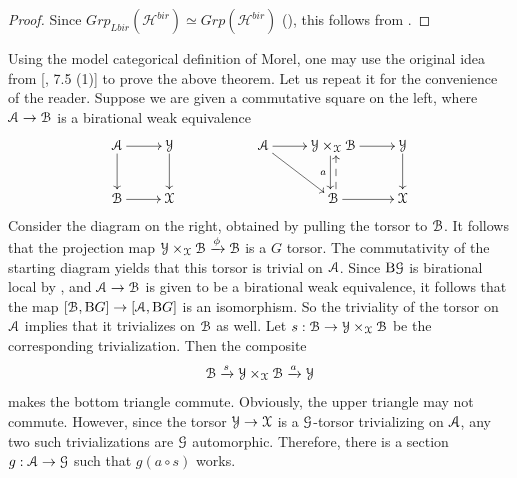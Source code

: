 \begin{proof}
Since $ Grp_{L{bir}}(\mathcal{H}^{bir})\simeq  Grp(\mathcal{H}^{bir})$ (), this follows from .
\end{proof}
\begin{rem}
Using the model categorical definition of Morel, one may use the original idea from [\cite{morel2012a1}, 7.5 (1)] to prove the above theorem. Let us repeat it for the convenience of the reader. Suppose we are given a commutative square on the left, where $\EuScript{A}\to \EuScript{B}$ is a birational weak equivalence \[\xymatrix{
 \esc{A}\ar[r]\ar[d]& \esc{Y}\ar[d]&& \esc{A}\ar[rd]\ar[r]&\esc{Y}\times_\esc{X}\esc{B}\ar[r]\ar@<-.2em>[d]_{a}& \esc{Y}\ar[d]\\
\esc{B}\ar[r]& \esc{X}&& &\esc{B}\ar@<-.2em>@{-->}[u]\ar[r]& \esc{X}
 }\]
 Consider the diagram on the right, obtained by pulling the torsor to $\EuScript{B}$. It follows that the projection map $\EuScript{Y}\times_\EuScript{X}\EuScript{B}\xrightarrow{\phi}\EuScript{B}$ is a $G$ torsor. The commutativity of the starting diagram yields that this torsor is trivial on $\EuScript{A}$. Since $\mathrm{B}\EuScript{G}$ is birational local by , and $\EuScript{A}\to \EuScript{B}$ is given to be a birational weak equivalence, it follows that the map $[\EuScript{B}, \mathrm{B}G]\to [\EuScript{A}, \mathrm{B}G]$ is an isomorphism. So the triviality of the torsor on $\EuScript{A}$ implies that it trivializes on $\EuScript{B}$ as well. Let $s: \EuScript{B}\to \EuScript{Y}\times_\EuScript{X}\EuScript{B}$ be the corresponding trivialization. Then the composite  $$\EuScript{B}\xrightarrow{s} \EuScript{Y}\times_\EuScript{X}\EuScript{B}\xrightarrow[]{a} \EuScript{Y}$$ makes the bottom triangle commute. Obviously, the upper triangle may not commute. However, since the torsor $\EuScript{Y}\to \EuScript{X}$ is a $\EuScript{G} $-torsor trivializing on $\EuScript{A}$, any two such trivializations are $\EuScript{G}$ automorphic. Therefore, there is a section $g: \EuScript{A}\to\EuScript{G}$ such that $g(a\circ s)$ works. 
\end{rem}
